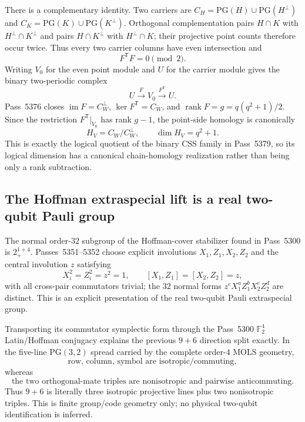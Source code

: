 There is a complementary identity.  Two carriers are
$C_H=\mathrm{PG}(H)\cup\mathrm{PG}(H^\perp)$ and $C_K=\mathrm{PG}(K)\cup\mathrm{PG}(K^\perp)$.  Orthogonal
complementation pairs $H\cap K$ with $H^\perp\cap K^\perp$ and pairs
$H\cap K^\perp$ with $H^\perp\cap K$; their projective point counts therefore
occur twice.  Thus every two carrier columns have even intersection and
\[
 \boxed{F^{\mathsf T}F=0\pmod2}.
\]
Writing $V_0$ for the even point module and $U$ for the carrier module gives the
binary two-periodic complex
\[
 U\xrightarrow{F}V_0\xrightarrow{F^{\mathsf T}}U.
\]
Pass~5376 closes $\operatorname{im}F=C_W^\perp$, $\ker F^{\mathsf T}=C_W$, and
$\operatorname{rank}F=g=q(q^2+1)/2$.  Since the restriction
$F^{\mathsf T}|_{V_0}$ has rank $g-1$, the point-side homology is canonically
\[
 \boxed{H_V=C_W/C_W^\perp,\qquad \dim H_V=q^2+1.}
\]
This is exactly the logical quotient of the binary CSS family in Pass~5379, so
its logical dimension has a canonical chain-homology realization rather than
being only a rank subtraction.

\subsection{The Hoffman extraspecial lift is a real two-qubit Pauli group}
\label{sec:pass5351-hoffman-pauli}
The normal order-$32$ subgroup of the Hoffman-cover stabilizer found in
Pass~5300 is $2_+^{1+4}$.  Passes~5351--5352 choose explicit involutions
$X_1,Z_1,X_2,Z_2$ and the central involution $z$ satisfying
\[
 X_i^2=Z_i^2=z^2=1,\qquad [X_1,Z_1]=[X_2,Z_2]=z,
\]
with all cross-pair commutators trivial; the $32$ normal forms
$z^eX_1^aZ_1^bX_2^cZ_2^d$ are distinct.  This is an explicit presentation of
the real two-qubit Pauli extraspecial group.

Transporting its commutator symplectic form through the Pass~5300
$\mathbb F_2^4$ Latin/Hoffman conjugacy explains the previous $9+6$ direction
split exactly.  In the five-line $\mathrm{PG}(3,2)$ spread carried by the complete
order-$4$ MOLS geometry,
\[
 \boxed{\text{row, column, symbol are isotropic/commuting}},
\]
whereas
\[
 \boxed{\text{the two orthogonal-mate triples are nonisotropic and pairwise
 anticommuting}}.
\]
Thus $9+6$ is literally three isotropic projective lines plus two nonisotropic
triples.  This is finite group/code geometry only; no physical two-qubit
identification is inferred.

